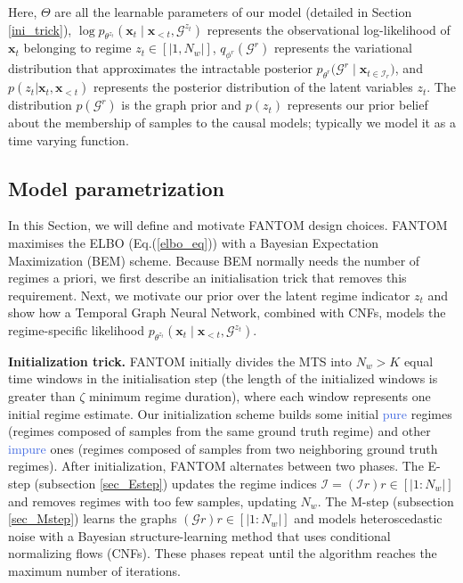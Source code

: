 Here, $\Theta$ are all the learnable parameters of our model (detailed in Section \ref{ini_trick}), $\log p_{\theta^{z_t}}\left(\boldsymbol{x}_t\mid \boldsymbol{x}_{<t}, \mathcal{G}^{z_t}\right)$
represents the observational log-likelihood of $\boldsymbol{x}_t$ belonging to regime $z_t \in [|1,N_w|]$, $q_{\phi^r}\left(\mathcal{G}^r\right)$ represents
the variational distribution that approximates the intractable posterior \(p_{\theta^r}\bigl(\mathcal{G}^r\mid \boldsymbol{x}_{t \in \mathcal{I}_r}\bigr)\), and $p( z_t  | \boldsymbol{x}_t, \boldsymbol{x}_{<t})$ represents the posterior distribution of the latent variables $z_t$. The distribution \(p(\mathcal{G}^r)\) is the graph prior and $p\left(z_t\right)$ represents our
prior belief about the membership of samples to the causal
models; typically we model it as a time varying function.
\subsection{Model parametrization}
In this Section, we will define and motivate FANTOM design choices. FANTOM maximises the ELBO (Eq.(\ref{elbo_eq})) with a Bayesian Expectation Maximization (BEM) scheme.  Because BEM normally needs the number of regimes a priori, we first describe an initialisation trick that removes this requirement. Next, we motivate our prior over the latent regime indicator $z_t$ and show how a Temporal Graph Neural Network, combined with CNFs, models the regime-specific likelihood $p_{\theta^{z_t}}\left(\boldsymbol{x}_t\mid \boldsymbol{x}_{<t}, \mathcal{G}^{z_t}\right)$.

\label{ini_trick}\textbf{Initialization trick. }FANTOM initially divides the MTS into $N_w > K$ equal time windows in the initialisation step (the length of the initialized windows is greater than $\zeta$ minimum regime duration), where each window represents one initial regime estimate. Our initialization scheme builds some initial \textcolor{RoyalBlue}{pure} regimes (regimes composed of samples from the same ground truth regime) and other \textcolor{RoyalBlue}{impure} ones (regimes composed of samples from two neighboring ground truth regimes). After initialization, FANTOM alternates between two phases. The E-step (subsection \ref{sec_Estep}) updates the regime indices $\mathcal{I}=(\mathcal{I}r){r\in[|1:N_w|]}$ and removes regimes with too few samples, updating $N_w$. The M-step (subsection \ref{sec_Mstep}) learns the graphs $(\mathcal{G}r){r\in[|1:N_w|]}$ and models heteroscedastic noise with a Bayesian structure-learning method that uses conditional normalizing flows (CNFs). These phases repeat until the algorithm reaches the maximum number of iterations.

